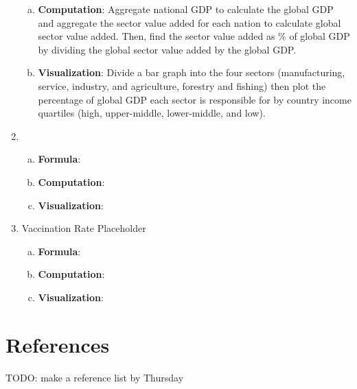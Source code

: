 \documentclass[fontsize=11pt]{article}
\begin{document}
\begin{enumerate}
\begin{enumerate}[(a)]
                \item \textbf{Computation}: Aggregate national GDP to calculate the global GDP and aggregate the sector value added for each nation to calculate global sector value added. Then, find the sector value added as \% of global GDP by dividing the global sector value added by the global GDP.
                \item \textbf{Visualization}: Divide a bar graph into the four sectors (manufacturing, service, industry, and agriculture, forestry and fishing) then plot the percentage of global GDP each sector is responsible for by country income quartiles (high, upper-middle, lower-middle, and low).
            \end{enumerate}
        \item
            \begin{enumerate}[(a)]
                \item \textbf{Formula}:
                \item \textbf{Computation}:
                \item \textbf{Visualization}:
            \end{enumerate}
        \item Vaccination Rate Placeholder
            \begin{enumerate}[(a)]
                \item \textbf{Formula}:
                \item \textbf{Computation}:
                \item \textbf{Visualization}:
            \end{enumerate}
    \end{enumerate}
\section*{References}
TODO: make a reference list by Thursday

\end{document}
